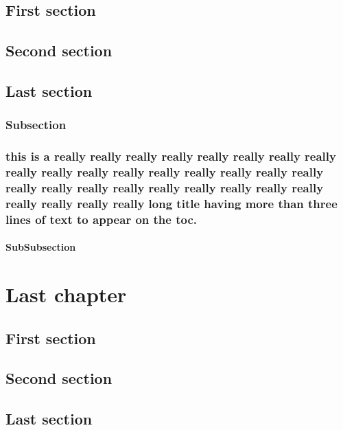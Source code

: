 \documentclass{mines-thesis}
\begin{document}
\section{First section} \lipsum[2-3]
\section{Second section} \lipsum[4-5]
\section{Last section} \lipsum[6-7]
\subsection{Subsection}
\lipsum[4-5]
\subsection{this is a really really really really really really really really really really really really really really really really really really really really really really really really really really really really really really long title having more than three lines of text to appear on the toc.}
\subsubsection{SubSubsection}
\lipsum[1]
\chapter{Last chapter} \lipsum[1]
\section{First section} \lipsum[2-3]
\section{Second section} \lipsum[4-5]
\section{Last section} \lipsum[6-7]

\end{document}
